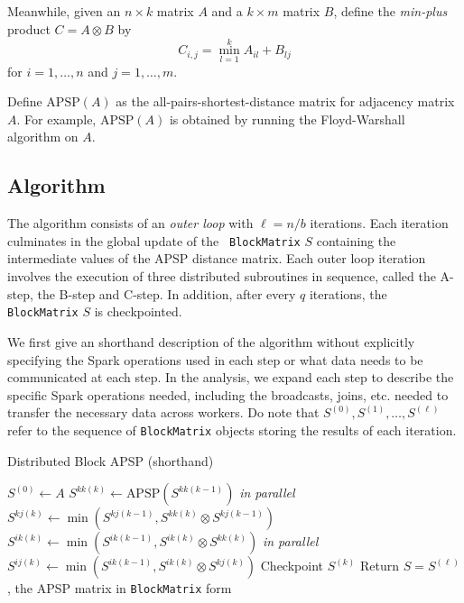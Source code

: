 \documentclass{article} %
\begin{document}
Meanwhile, given an $n \times k$ matrix $A$ and a $k \times m$ matrix $B$, define
the \emph{min-plus} product $C = A \otimes B$ by
\[
C_{i,j} = \min_{l = 1}^k A_{il} + B_{lj}
\]
for $i = 1,\hdots, n$ and $j = 1,\hdots, m$.

Define $\text{APSP}(A)$ as the all-pairs-shortest-distance matrix for
adjacency matrix $A$.  For example, $\text{APSP}(A)$ is obtained by
running the Floyd-Warshall algorithm on $A$.

\subsection{Algorithm}

The algorithm consists of an \emph{outer loop} with $\ell = n/b$ iterations.
Each iteration culminates in the global update of the {\tt
  BlockMatrix} $S$ containing the intermediate values of the APSP
distance matrix.  Each outer loop iteration involves the execution of
three distributed subroutines in sequence, called the A-step, the
B-step and C-step.  In addition, after every $q$ iterations, the {\tt
  BlockMatrix} $S$ is checkpointed.

We first give an shorthand description of the algorithm without
explicitly specifying the Spark operations used in each step or what
data needs to be communicated at each step.  In the analysis, we
expand each step to describe the specific Spark operations needed,
including the broadcasts, joins, etc. needed to transfer the necessary
data across workers.  Do note that $S^{(0)}, S^{(1)},\hdots,
S^{(\ell)}$ refer to the sequence of {\tt BlockMatrix} objects storing
the results of each iteration.

\begin{algorithm}[H]
\caption{Distributed Block APSP (shorthand)}
\begin{algorithmic}
  \State $S^{(0)} \leftarrow A$
    \State [A-step]
    \State $S^{kk(k)} \leftarrow \text{APSP}(S^{kk(k-1)})$
    \State [B-step]
     \emph{in parallel}
        \State $S^{kj(k)} \leftarrow \min(S^{kj(k-1)}, S^{kk(k)} \otimes S^{kj(k-1)})$ 
      \EndIf
        \State $S^{ik(k)} \leftarrow \min(S^{ik(k-1)}, S^{ik(k)} \otimes S^{kk(k)})$
      \EndIf
    \EndFor
    \State [C-step]
     \emph{in parallel}
        \State $S^{ij(k)} \leftarrow \min(S^{ik(k-1)}, S^{ik(k)} \otimes S^{kj(k)})$
      \EndIf
    \EndFor
    \State [D-step]
      \State Checkpoint $S^{(k)}$
    \EndIf
  \EndFor
  \State Return $S = S^{(\ell)}$, the APSP matrix in {\tt BlockMatrix} form
\EndFunction
\end{algorithmic}
\end{algorithm}
\end{document}
